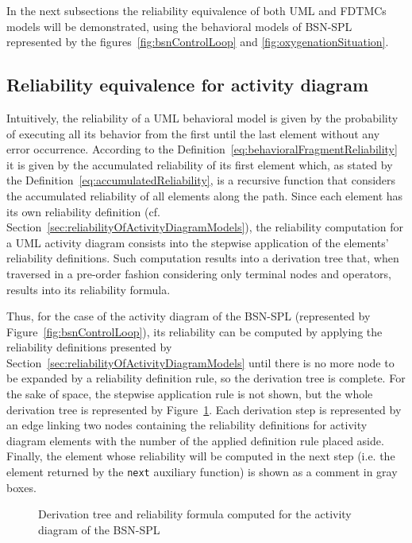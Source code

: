 In the next subsections the reliability equivalence of both UML and FDTMCs
models will be demonstrated, using the behavioral models of BSN-SPL represented by the
figures~\ref{fig:bsnControlLoop} and \ref{fig:oxygenationSituation}. 


\subsection{Reliability equivalence for activity diagram
	\label{sec:activityDiagramEquivalence}}

Intuitively, the reliability of a UML behavioral model is given by the
probability of executing all its behavior from the first until the last element
without any error occurrence. According to the
Definition~\ref{eq:behavioralFragmentReliability} it is given by the
accumulated reliability of its first element which, as stated by the
Definition~\ref{eq:accumulatedReliability}, is a recursive function that
considers the accumulated reliability of all elements along the path. Since
each element has its own reliability definition (cf.
Section~\ref{sec:reliabilityOfActivityDiagramModels}), the reliability
computation for a UML activity diagram consists into the stepwise application
of the elements' reliability definitions. Such computation results into a
derivation tree that, when traversed in a pre-order fashion  considering only
terminal nodes and operators, results into its reliability formula. 

Thus, for the case of the activity diagram of the BSN-SPL (represented by
Figure~\ref{fig:bsnControlLoop}), its reliability can be computed by applying
the reliability definitions presented by
Section~\ref{sec:reliabilityOfActivityDiagramModels} until there is no more
node to be expanded by a reliability definition rule, so the
derivation tree is complete. For the sake of space, the stepwise application
rule is not shown, but the whole derivation tree is represented by
Figure~\ref{fig:derivationTreeBSNLoop}. Each derivation step is represented by
an edge linking two nodes containing the reliability definitions for activity
diagram elements with the number of the applied definition rule placed aside.
Finally, the element whose reliability will be computed in the next step (i.e.
the element returned by the \texttt{next} auxiliary function) is shown as a
comment in gray boxes. 

\begin{figure}[htp]
	\centering
	\resizebox{\columnwidth}{!}{}
	\caption{Derivation tree and reliability formula computed for the activity diagram of the BSN-SPL}
	\label{fig:derivationTreeBSNLoop}
\end{figure}

